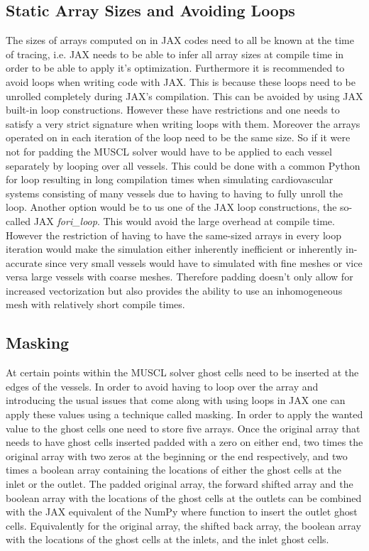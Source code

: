 \documentclass[a4paper, oneside]{discothesis}
\begin{document}
\subsection{Static Array Sizes and Avoiding Loops} \label{sec:al}
The sizes of arrays computed on in JAX codes need to all be known at the time of tracing, i.e. JAX needs to be able to infer all array sizes at compile time in order to be able to apply it's optimization.
Furthermore it is recommended to avoid loops when writing code with JAX.
This is because these loops need to be unrolled completely during JAX's compilation.
This can be avoided by using JAX built-in loop constructions.
However these have restrictions and one needs to satisfy a very strict signature when writing loops with them.
Moreover the arrays operated on in each iteration of the loop need to be the same size.
So if it were not for padding the MUSCL solver would have to be applied to each vessel separately by looping over all vessels.
This could be done with a common Python for loop resulting in long compilation times when simulating cardiovascular systems consisting of many vessels due to having to having to fully unroll the loop.
Another option would be to us one of the JAX loop constructions, the so-called JAX \emph{fori\_loop}.
This would avoid the large overhead at compile time.
However the restriction of having to have the same-sized arrays in every loop iteration would make the simulation either inherently inefficient or inherently in-accurate since very small vessels would have to simulated with fine meshes or vice versa large vessels with coarse meshes.
Therefore padding doesn't only allow for increased vectorization but also provides the ability to use an inhomogeneous mesh with relatively short compile times.

\subsection{Masking} \label{sec:msk}
At certain points within the MUSCL solver ghost cells need to be inserted at the edges of the vessels.
In order to avoid having to loop over the array and introducing the usual issues that come along with using loops in JAX one can apply these values using a technique called masking.
In order to apply the wanted value to the ghost cells one need to store five arrays.
Once the original array that needs to have ghost cells inserted padded with a zero on either end, two times the original array with two zeros at the beginning or the end respectively, and two times a boolean array containing the locations of either the ghost cells at the inlet or the outlet.
The padded original array, the forward shifted array and the boolean array with the locations of the ghost cells at the outlets can be combined with the JAX equivalent of the NumPy where function to insert the outlet ghost cells.
Equivalently for the original array, the shifted back array, the boolean array with the locations of the ghost cells at the inlets, and the inlet ghost cells.
\end{document}
